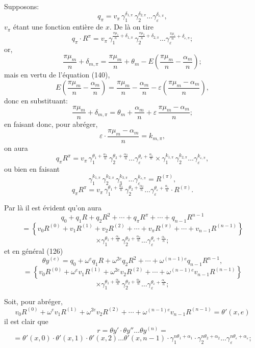 \documentclass{article}
\begin{document}
Supposons:
\[ q_\pi = v_\pi\,\gamma_1^{\delta_{1,\pi}}\,\gamma_2^{\delta_{2,\pi}} \ldots \gamma_\varepsilon^{\delta_{\varepsilon,\pi}}, \tag{143} \]
$v_\pi$ étant une fonction entière de $x$.
De là on tire
\[ q_\pi \cdot R^{\pi} = v_\pi\,\gamma_1^{\frac{\pi\mu_1}{n}+\delta_{1,\pi}}\,\gamma_2^{\frac{\pi\mu_2}{n}+\delta_{2,\pi}} \ldots \gamma_\varepsilon^{\frac{\pi\mu_\varepsilon}{n}+\delta_{\varepsilon,\pi}}; \]
or,
\[ \frac{\pi\mu_m}{n} + \delta_{m,\pi} = \frac{\pi\mu_m}{n} + \theta_m - E\left(\frac{\pi\mu_m}{n} - \frac{\alpha_m}{n}\right); \]
mais en vertu de l'équation (140),
\[ E\left(\frac{\pi\mu_m}{n} - \frac{\alpha_m}{n}\right) = \frac{\pi\mu_m}{n} - \frac{\alpha_m}{n} - \varepsilon\left(\frac{\pi\mu_m-\alpha_m}{n}\right), \]
donc en substituant:
\[ \frac{\pi\mu_m}{n} + \delta_{m,\pi} = \theta_m + \frac{\alpha_m}{n} + \varepsilon\,\frac{\pi\mu_m-\alpha_m}{n}; \tag{144} \]
en faisant donc, pour abréger,
\[ \varepsilon \cdot \frac{\pi\mu_m-\alpha_m}{n} = k_{m,\pi}, \tag{145} \]
on aura
\[ q_\pi R^{\pi} = v_\pi\,\gamma_1^{\theta_1+\frac{\alpha_1}{n}}\,\gamma_2^{\theta_2+\frac{\alpha_2}{n}} \ldots \gamma_\varepsilon^{\theta_\varepsilon+\frac{\alpha_\varepsilon}{n}} \times \gamma_1^{k_{1,\pi}}\,\gamma_2^{k_{2,\pi}} \ldots \gamma_\varepsilon^{k_{\varepsilon,\pi}}, \tag{146} \]
ou bien en faisant
\[ \gamma_1^{k_{1,\pi}}\,\gamma_2^{k_{2,\pi}}\,\gamma_3^{k_{3,\pi}} \ldots \gamma_\varepsilon^{k_{\varepsilon,\pi}} = R^{(\pi)}, \tag{147} \]
\[ q_\pi R^{\pi} = v_\pi\,\gamma_1^{\theta_1+\frac{\alpha_1}{n}}\,\gamma_2^{\theta_2+\frac{\alpha_2}{n}} \ldots \gamma_\varepsilon^{\theta_\varepsilon+\frac{\alpha_\varepsilon}{n}} \cdot R^{(\pi)}. \tag{148} \]

Par là il est évident qu'on aura
\[ q_0+q_1 R+q_2 R^{2}+\cdots+q_\pi R^{\pi}+\cdots+q_{n-1}R^{n-1} \]
\[ = \left\{v_0 R^{(0)}+v_1 R^{(1)}+v_2 R^{(2)}+\cdots+v_\pi R^{(\pi)}+\cdots+v_{n-1}R^{(n-1)}\right\} \]
\[ \times \gamma_1^{\theta_1+\frac{\alpha_1}{n}}\,\gamma_2^{\theta_2+\frac{\alpha_2}{n}} \ldots \gamma_\varepsilon^{\theta_\varepsilon+\frac{\alpha_\varepsilon}{n}}; \tag{149} \]
et en général (126)
\[ \theta y^{(e)} = q_0 + \omega^{e}q_1 R + \omega^{2e}q_2 R^{2} + \cdots + \omega^{(n-1)e}q_{n-1}R^{n-1}, \]
\[ = \left\{v_0 R^{(0)}+\omega^{e}v_1 R^{(1)}+\omega^{2e}v_2 R^{(2)}+\cdots+\omega^{(n-1)e}v_{n-1}R^{(n-1)}\right\} \]
\[ \times \gamma_1^{\theta_1+\frac{\alpha_1}{n}}\,\gamma_2^{\theta_2+\frac{\alpha_2}{n}} \ldots \gamma_\varepsilon^{\theta_\varepsilon+\frac{\alpha_\varepsilon}{n}}; \tag{150} \]

Soit, pour abréger,
\[ v_0 R^{(0)}+\omega^{e}v_1 R^{(1)}+\omega^{2e}v_2 R^{(2)}+\cdots+\omega^{(n-1)e}v_{n-1}R^{(n-1)} = \theta'(x, e) \tag{151} \]
il est clair que
\[ r = \theta y' \cdot \theta y'' \ldots \theta y^{(n)} = \]
\[ = \theta'(x, 0) \cdot \theta'(x, 1) \cdot \theta'(x, 2) \ldots \theta'(x, n-1) \cdot \gamma_1^{n\theta_1+\alpha_1} \cdot \gamma_2^{n\theta_2+\alpha_2} \ldots \gamma_\varepsilon^{n\theta_\varepsilon+\alpha_\varepsilon}; \tag{152} \]
\end{document}
